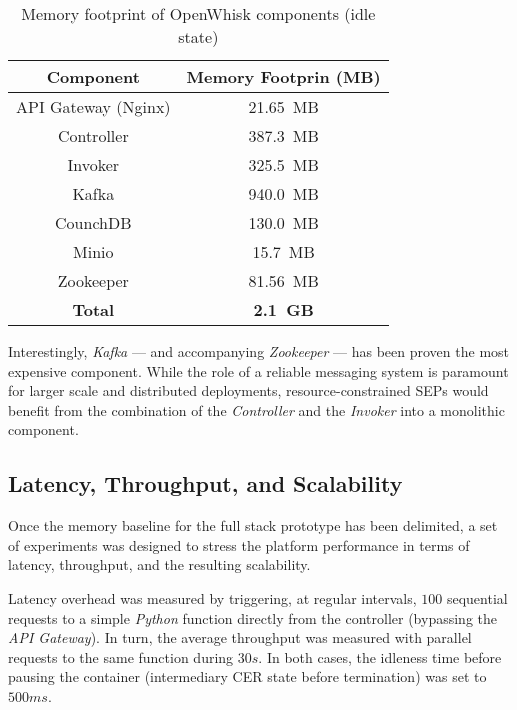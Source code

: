 \begin{table}[tbp]
\renewcommand{\arraystretch}{1.3}
\caption{Memory footprint of OpenWhisk components (idle state)}
\label{tab:OPENWHISK_MEM_FOOTPRINT}
\centering
\begin{tabular}{|c|c|}
\hline
\textbf{Component} & \textbf{Memory Footprin (MB)}\\
\hline
API Gateway (Nginx) & 21.65~MB\\
\hline
Controller          & 387.3~MB\\
\hline
Invoker             & 325.5~MB\\
\hline
Kafka               & 940.0~MB\\
\hline
CounchDB            & 130.0~MB\\
\hline
Minio               & 15.7~MB\\
\hline
Zookeeper           & 81.56~MB\\
\hline
\textbf{Total}      & \textbf{2.1~GB}\\
\hline
\end{tabular}
\end{table}


Interestingly, \textit{Kafka} --- and accompanying \textit{Zookeeper} --- has been proven the most expensive component. While the role of a reliable messaging system is paramount for larger scale and distributed deployments, resource-constrained SEPs would benefit from the combination of the \textit{Controller} and the \textit{Invoker} into a monolithic component.

\subsection{Latency, Throughput, and Scalability}

Once the memory baseline for the full stack prototype has been delimited, a set of experiments was designed to stress the platform performance in terms of latency, throughput, and the resulting scalability.

Latency overhead was measured by triggering, at regular intervals, $100$ sequential requests to a simple \textit{Python} function directly from the controller (bypassing the \textit{API Gateway}). In turn, the average throughput was measured with parallel requests to the same function during $30s$. In both cases, the idleness time before pausing the container (intermediary CER state before termination) was set to $500ms$.

